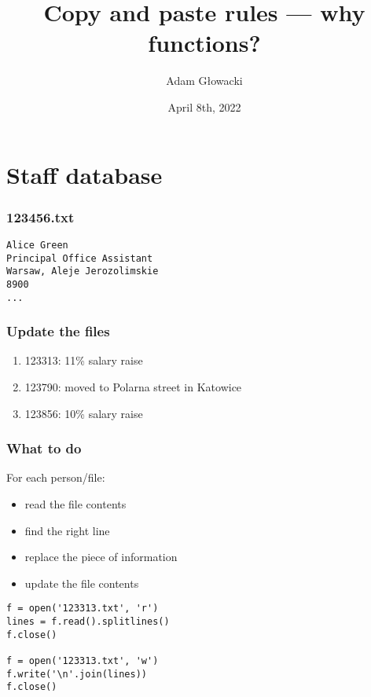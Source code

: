 \documentclass[aspectratio=169]{beamer}
\title{Copy and paste rules --- why functions?}
\author{Adam Głowacki}
\date{April 8th, 2022}
\begin{document}
\begin{frame}
\titlepage
\end{frame}

\section{Staff database}

\begin{frame}[fragile]
\frametitle{123456.txt}
\begin{verbatim}
Alice Green
Principal Office Assistant
Warsaw, Aleje Jerozolimskie
8900
...
\end{verbatim}
\end{frame}

\begin{frame}
\frametitle{Update the files}
\begin{enumerate}
  \item 123313: 11\% salary raise
  \item 123790: moved to Polarna street in Katowice
  \item 123856: 10\% salary raise
\end{enumerate}
\end{frame}

\begin{frame}
\frametitle{What to do}
For each person/file:
\begin{itemize}
  \item read the file contents
  \item find the right line
  \item replace the piece of information
  \item update the file contents
\end{itemize}
\end{frame}

\begin{frame}[fragile]
\begin{lstlisting}
f = open('123313.txt', 'r')
lines = f.read().splitlines()
f.close()

f = open('123313.txt', 'w')
f.write('\n'.join(lines))
f.close()
\end{lstlisting}
\end{frame}
\end{document}
